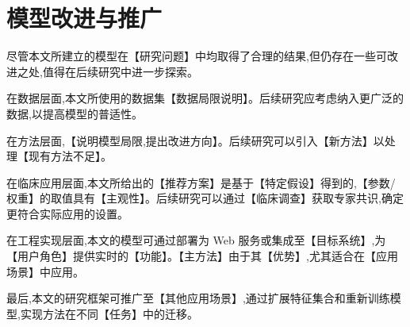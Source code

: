 
\section{模型改进与推广}

尽管本文所建立的模型在【研究问题】中均取得了合理的结果,但仍存在一些可改进之处,值得在后续研究中进一步探索。

在数据层面,本文所使用的数据集【数据局限说明】。后续研究应考虑纳入更广泛的数据,以提高模型的普适性。

在方法层面,【说明模型局限,提出改进方向】。后续研究可以引入【新方法】以处理【现有方法不足】。

在临床应用层面,本文所给出的【推荐方案】是基于【特定假设】得到的,【参数/权重】的取值具有【主观性】。后续研究可以通过【临床调查】获取专家共识,确定更符合实际应用的设置。

在工程实现层面,本文的模型可通过部署为 Web 服务或集成至【目标系统】,为【用户角色】提供实时的【功能】。【主方法】由于其【优势】,尤其适合在【应用场景】中应用。

最后,本文的研究框架可推广至【其他应用场景】,通过扩展特征集合和重新训练模型,实现方法在不同【任务】中的迁移。
